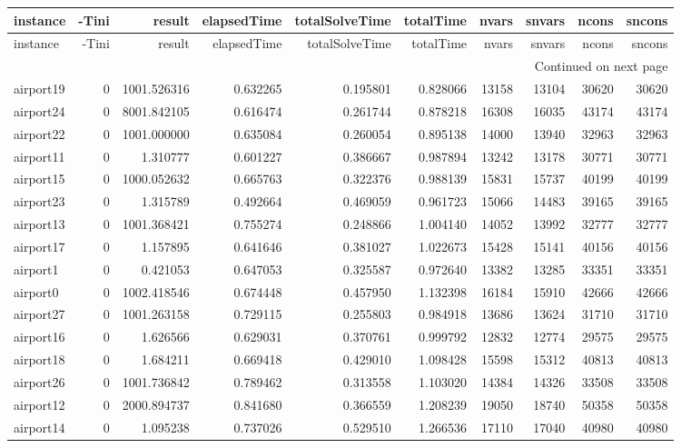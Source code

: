 \begin{longtable}{|l|r|r|r|r|r|r|r|r|r|}
\toprule
instance & -Tini & result & elapsedTime & totalSolveTime & totalTime & nvars & snvars & ncons & sncons \\
\midrule
\endfirsthead
\toprule
instance & -Tini & result & elapsedTime & totalSolveTime & totalTime & nvars & snvars & ncons & sncons \\
\midrule
\endhead
\midrule
\multicolumn{10}{r}{Continued on next page} \\
\midrule
\endfoot
\bottomrule
\endlastfoot
airport19 & 0 & 1001.526316 & 0.632265 & 0.195801 & 0.828066 & 13158 & 13104 & 30620 & 30620 \\
airport24 & 0 & 8001.842105 & 0.616474 & 0.261744 & 0.878218 & 16308 & 16035 & 43174 & 43174 \\
airport22 & 0 & 1001.000000 & 0.635084 & 0.260054 & 0.895138 & 14000 & 13940 & 32963 & 32963 \\
airport11 & 0 & 1.310777 & 0.601227 & 0.386667 & 0.987894 & 13242 & 13178 & 30771 & 30771 \\
airport15 & 0 & 1000.052632 & 0.665763 & 0.322376 & 0.988139 & 15831 & 15737 & 40199 & 40199 \\
airport23 & 0 & 1.315789 & 0.492664 & 0.469059 & 0.961723 & 15066 & 14483 & 39165 & 39165 \\
airport13 & 0 & 1001.368421 & 0.755274 & 0.248866 & 1.004140 & 14052 & 13992 & 32777 & 32777 \\
airport17 & 0 & 1.157895 & 0.641646 & 0.381027 & 1.022673 & 15428 & 15141 & 40156 & 40156 \\
airport1 & 0 & 0.421053 & 0.647053 & 0.325587 & 0.972640 & 13382 & 13285 & 33351 & 33351 \\
airport0 & 0 & 1002.418546 & 0.674448 & 0.457950 & 1.132398 & 16184 & 15910 & 42666 & 42666 \\
airport27 & 0 & 1001.263158 & 0.729115 & 0.255803 & 0.984918 & 13686 & 13624 & 31710 & 31710 \\
airport16 & 0 & 1.626566 & 0.629031 & 0.370761 & 0.999792 & 12832 & 12774 & 29575 & 29575 \\
airport18 & 0 & 1.684211 & 0.669418 & 0.429010 & 1.098428 & 15598 & 15312 & 40813 & 40813 \\
airport26 & 0 & 1001.736842 & 0.789462 & 0.313558 & 1.103020 & 14384 & 14326 & 33508 & 33508 \\
airport12 & 0 & 2000.894737 & 0.841680 & 0.366559 & 1.208239 & 19050 & 18740 & 50358 & 50358 \\
airport14 & 0 & 1.095238 & 0.737026 & 0.529510 & 1.266536 & 17110 & 17040 & 40980 & 40980 \\

\end{longtable}
